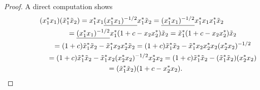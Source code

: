 \documentclass[11pt]{article}
\numberwithin{equation}{section}
\begin{document}
\begin{proof}A direct computation shows
\begin{gather*}
( x_{1}^{\ast}x_{1}) ( \tilde{x}_{1}^{\ast}\tilde{x}_{2}) =x_{1}^{\ast}x_{1}\underline{( x_{1}^{\ast}x_{1})
^{-1/2}}x_{1}^{\ast}\tilde{x}_{2}=\underline{( x_{1}^{\ast}x_{1})
^{-1/2}}x_{1}^{\ast}x_{1}x_{1}^{\ast}\tilde{x}_{2}%
\\
\hphantom{( x_{1}^{\ast}x_{1}) ( \tilde{x}_{1}^{\ast}\tilde{x}_{2})}{}
=\underline{( x_{1}^{\ast}x_{1}) ^{-1/2}}x_{1}^{\ast}(
1+c-x_{2}x_{2}^{\ast}) \tilde{x}_{2}=\tilde{x}_{1}^{\ast}(
1+c-x_{2}x_{2}^{\ast}) \tilde{x}_{2}\\
\hphantom{( x_{1}^{\ast}x_{1}) ( \tilde{x}_{1}^{\ast}\tilde{x}_{2})}{}
=( 1+c) \tilde{x}%
_{1}^{\ast}\tilde{x}_{2}-\tilde{x}_{1}^{\ast}x_{2}x_{2}^{\ast}\tilde{x}_{2}
=( 1+c) \tilde{x}_{1}^{\ast}\tilde{x}_{2}-\tilde{x}_{1}^{\ast
}x_{2}x_{2}^{\ast}x_{2}( x_{2}^{\ast}x_{2}) ^{-1/2}\\
\hphantom{( x_{1}^{\ast}x_{1}) ( \tilde{x}_{1}^{\ast}\tilde{x}_{2})}{}
=(1+c) \tilde{x}_{1}^{\ast}\tilde{x}_{2}-\tilde{x}_{1}^{\ast}x_{2}(
x_{2}^{\ast}x_{2}) ^{-1/2}x_{2}^{\ast}x_{2}
=( 1+c) \tilde{x}_{1}^{\ast}\tilde{x}_{2}-( \tilde{x}%
_{1}^{\ast}\tilde{x}_{2}) ( x_{2}^{\ast}x_{2}) \\
\hphantom{( x_{1}^{\ast}x_{1}) ( \tilde{x}_{1}^{\ast}\tilde{x}_{2})}{}
=(\tilde{x}_{1}^{\ast}\tilde{x}_{2}) ( 1+c-x_{2}^{\ast}x_{2}) .\tag*{\qed}
\end{gather*}
\renewcommand{\qed}{}
\end{proof}
\end{document}

